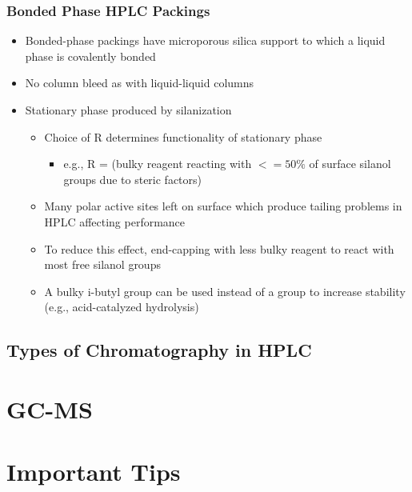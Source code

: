 \documentclass[a4paper, 12pt]{article}
\begin{document}
\subsubsection{Bonded Phase HPLC Packings}

\begin{itemize}
	\item Bonded-phase packings have microporous silica support to which a liquid phase is covalently bonded
	\item No column bleed as with liquid-liquid columns
	\item Stationary phase produced by silanization
	\begin{itemize}
		\item Choice of R determines functionality of stationary phase
		\begin{itemize}
			\item e.g., R =  (bulky reagent reacting with $<=50\%$ of surface silanol groups due to steric factors)
		\end{itemize}
		\item Many polar active sites left on surface which produce tailing problems in HPLC affecting performance
		\item To reduce this effect, end-capping with less bulky reagent to react with most free silanol groups
		\item A bulky i-butyl group can be used instead of a  group to increase stability (e.g., acid-catalyzed hydrolysis)
	\end{itemize}
\end{itemize}

\subsection{Types of Chromatography in HPLC}


\section{GC-MS}


\section{Important Tips}
\end{document}
